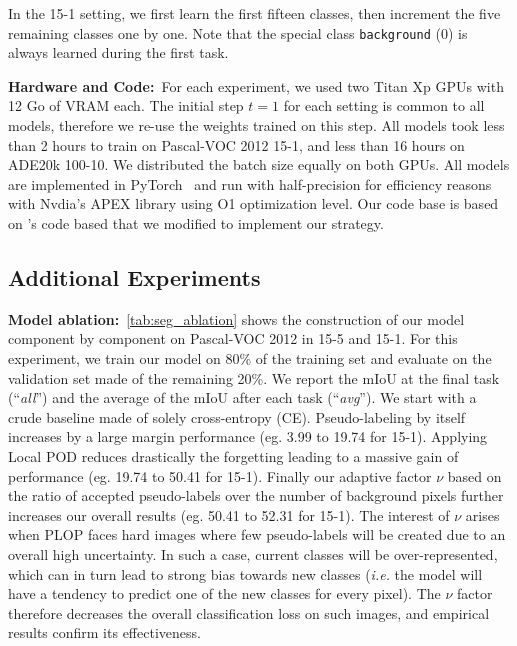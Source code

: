 In the 15-1 setting, we first learn the first fifteen classes, then increment the five remaining
classes one by one. Note that the special class \texttt{background} (0) is always learned during the
first task.

\noindent\textbf{Hardware and Code:\,} For each experiment, we used two Titan Xp GPUs with 12 Go of
VRAM each. The initial step $t=1$ for each setting is common to all models, therefore we re-use the
weights trained on this step. All models took less than 2 hours to train on Pascal-VOC 2012 15-1,
and less than 16 hours on ADE20k 100-10. We distributed the batch size equally on both GPUs. All
models are implemented in PyTorch~\citep{paszke2017pytorch} and run with half-precision for
efficiency reasons with Nvdia's APEX library using O1 optimization level. Our code base is based on
\citet{cermelli2020modelingthebackground}'s code based that we modified to implement our strategy.

\subsection{Additional Experiments}

\noindent\textbf{Model ablation:\,} \autoref{tab:seg_ablation} shows the construction of our model
component by component on Pascal-VOC 2012 in 15-5 and 15-1. For this experiment, we train our model
on 80\% of the training set and evaluate on the validation set made of the remaining 20\%. We report
the mIoU at the final task (``\textit{all}'') and the average of the mIoU after each task
(``\textit{avg}''). We start with a crude baseline made of solely cross-entropy (CE).
Pseudo-labeling by itself increases by a large margin performance (eg. 3.99 to 19.74 for 15-1).
Applying Local POD reduces drastically the forgetting leading to a massive gain of performance (eg.
19.74 to 50.41 for 15-1). Finally our adaptive factor $\nu$ based on the ratio of accepted
pseudo-labels over the number of background pixels further increases our overall results (eg. 50.41
to 52.31 for 15-1). The interest of $\nu$ arises when PLOP faces hard images where few pseudo-labels
will be created due to an overall high uncertainty. In such a case, current classes will be
over-represented, which can in turn lead to strong bias towards new classes (\textit{i.e.} the model
will have a tendency to predict one of the new classes for every pixel). The $\nu$ factor therefore
decreases the overall classification loss on such images, and empirical results confirm its
effectiveness.

